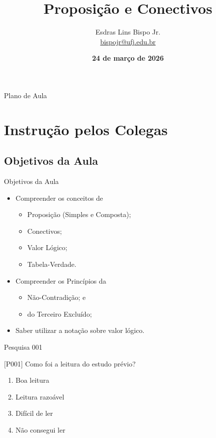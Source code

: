 \documentclass[xcolor=dvipsnames,table]{beamer}
\title{Proposição e Conectivos}
\author{
  Esdras Lins Bispo Jr. \\ \url{bispojr@ufj.edu.br}
  }
\institute{
  Lógica para Ciência da Computação \\Bacharelado em Ciência da Computação}
\date{\textbf{24 de março de 2026} }
\begin{document}
	\begin{frame}
		\titlepage
	\end{frame}

	\AtBeginSection{
		\begin{frame}{Sumário}%
    		\tableofcontents[currentsection]
		\end{frame}
	}

	\begin{frame}{Plano de Aula}
		\tableofcontents
	\end{frame}
	
	\section{Instrução pelos Colegas}
	\subsection{Objetivos da Aula}
	\begin{frame}{Objetivos da Aula}
		\begin{itemize}
			\item Compreender os conceitos de
			\begin{itemize}[label=$\bullet$]
				\item Proposição (Simples e Composta);
				\item Conectivos;
				\item Valor Lógico;
				\item Tabela-Verdade.
			\end{itemize}
		\item Compreender os Princípios da 
			\begin{itemize}[label=$\bullet$]
				\item Não-Contradição; e 
				\item do Terceiro Excluído;
			\end{itemize}
		\item Saber utilizar a notação sobre valor lógico.
		\end{itemize}
	\end{frame}

    \begin{frame}{Pesquisa 001}
		\begin{block}{[P001]}
			Como foi a leitura do estudo prévio?
		\end{block}
		\begin{enumerate}[label=(\Alph*)]
			\item Boa leitura
			\item Leitura razoável
			\item Difícil de ler
			\item Não consegui ler
		\end{enumerate}
	\end{frame}
\end{document}
